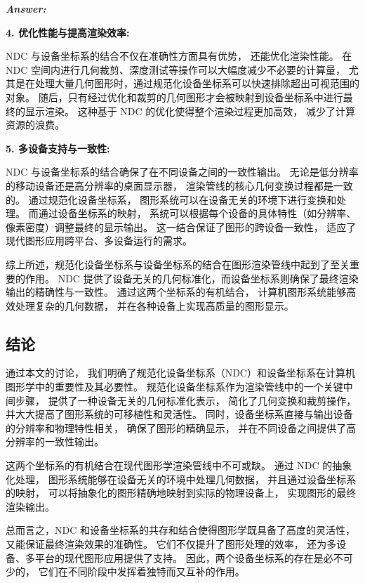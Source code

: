 \documentclass[12pt]{article}
\newenvironment{Answer}{
  \vspace{12pt}
  {\large\textbf{\textit{\hspace{-12pt}Answer:}}}\par
  \vspace{8pt}
} {\vspace{24pt}}
\begin{document}
\begin{Answer}
\noindent\textbf{4. 优化性能与提高渲染效率:}

NDC 与设备坐标系的结合不仅在准确性方面具有优势，
还能优化渲染性能。
在 NDC 空间内进行几何裁剪、深度测试等操作可以大幅度减少不必要的计算量，
尤其是在处理大量几何图形时，通过规范化设备坐标系可以快速排除超出可视范围的对象。
随后，只有经过优化和裁剪的几何图形才会被映射到设备坐标系中进行最终的显示渲染。
这种基于 NDC 的优化使得整个渲染过程更加高效，
减少了计算资源的浪费。

\noindent\textbf{5. 多设备支持与一致性:}

NDC 与设备坐标系的结合确保了在不同设备之间的一致性输出。
无论是低分辨率的移动设备还是高分辨率的桌面显示器，
渲染管线的核心几何变换过程都是一致的。
通过规范化设备坐标系，
图形系统可以在设备无关的环境下进行变换和处理。
而通过设备坐标系的映射，
系统可以根据每个设备的具体特性（如分辨率、像素密度）调整最终的显示输出。
这一结合保证了图形的跨设备一致性，
适应了现代图形应用跨平台、多设备运行的需求。

综上所述，规范化设备坐标系与设备坐标系的结合在图形渲染管线中起到了至关重要的作用。
NDC 提供了设备无关的几何标准化，而设备坐标系则确保了最终渲染输出的精确性与一致性。
通过这两个坐标系的有机结合，
计算机图形系统能够高效处理复杂的几何数据，
并在各种设备上实现高质量的图形显示。

\subsection*{结论}
\noindent

通过本文的讨论，
我们明确了规范化设备坐标系（NDC）和设备坐标系在计算机图形学中的重要性及其必要性。
规范化设备坐标系作为渲染管线中的一个关键中间步骤，
提供了一种设备无关的几何标准化表示，
简化了几何变换和裁剪操作，
并大大提高了图形系统的可移植性和灵活性。
同时，设备坐标系直接与输出设备的分辨率和物理特性相关，
确保了图形的精确显示，
并在不同设备之间提供了高分辨率的一致性输出。

这两个坐标系的有机结合在现代图形学渲染管线中不可或缺。
通过 NDC 的抽象化处理，
图形系统能够在设备无关的环境中处理几何数据，
并且通过设备坐标系的映射，
可以将抽象化的图形精确地映射到实际的物理设备上，
实现图形的最终渲染输出。

总而言之，NDC 和设备坐标系的共存和结合使得图形学既具备了高度的灵活性，
又能保证最终渲染效果的准确性。
它们不仅提升了图形处理的效率，
还为多设备、多平台的现代图形应用提供了支持。
因此，两个设备坐标系的存在是必不可少的，
它们在不同阶段中发挥着独特而又互补的作用。

\end{Answer}
\end{document}
